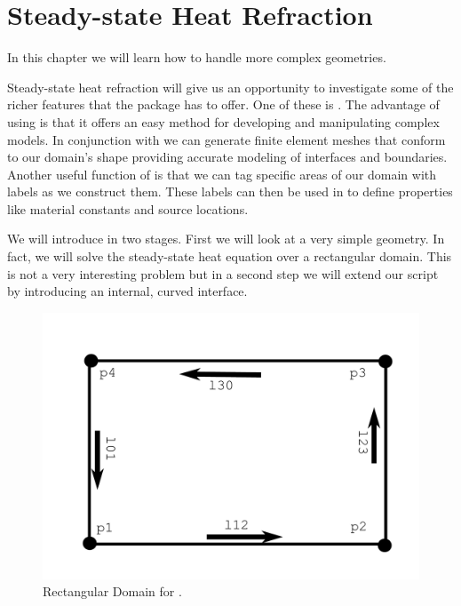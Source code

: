 
%
%
%

\section{Steady-state Heat Refraction}
\label{STEADY-STATE HEAT REFRACTION}

In this chapter we will learn how to handle more complex geometries. 

Steady-state heat refraction will give us an opportunity to investigate some of the richer features that the \esc package has to offer. One of these is \pycad . The advantage of using \pycad is that it offers an easy method for developing and manipulating complex models. In conjunction with \gmsh we can generate finite element meshes that conform to our domain's shape providing accurate modeling of interfaces and boundaries. Another useful function of \pycad is that we can tag specific areas of our domain with labels as we construct them. These labels can then be used in \esc to define properties like material constants and source locations. 

We will introduce in two stages. First we will look at a very simple geometry. In fact,  we will solve 
the steady-state heat equation over a rectangular domain. This is not a very interesting problem but in a second
step we will extend our script by introducing an internal, curved interface.

\begin{figure}[ht]
\centerline{\includegraphics[width=4.in]{figures/pycadrec}}
\caption{Rectangular Domain for \pycad.}
\label{fig:pycad rec}
\end{figure}

